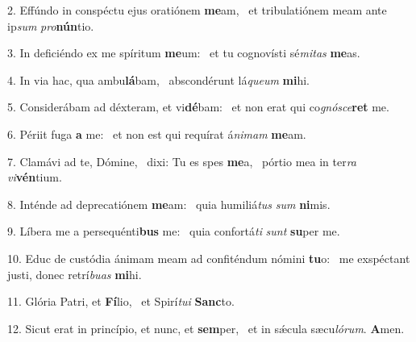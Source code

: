 2. Effúndo in conspéctu ejus oratiónem \textbf{me}am, \ast\  et tribulatiónem meam ante ip\textit{sum} \textit{pro}\textbf{nún}tio.\

3. In deficiéndo ex me spíritum \textbf{me}um: \ast\  et tu cognovísti sé\textit{mi}\textit{tas} \textbf{me}as.\

4. In via hac, qua ambu\textbf{lá}bam, \ast\  abscondérunt lá\textit{que}\textit{um} \textbf{mi}hi.\

5. Considerábam ad déxteram, et vi\textbf{dé}bam: \ast\  et non erat qui co\textit{gnó}\textit{sce}\textbf{ret} me.\

6. Périit fuga \textbf{a} me: \ast\  et non est qui requírat á\textit{ni}\textit{mam} \textbf{me}am.\

7. Clamávi ad te, Dómine, \dag\  dixi: Tu es spes \textbf{me}a, \ast\  pórtio mea in ter\textit{ra} \textit{vi}\textbf{vén}tium.\

8. Inténde ad deprecatiónem \textbf{me}am: \ast\  quia humiliá\textit{tus} \textit{sum} \textbf{ni}mis.\

9. Líbera me a persequénti\textbf{bus} me: \ast\  quia confortá\textit{ti} \textit{sunt} \textbf{su}per me.\

10. Educ de custódia ánimam meam ad confiténdum nómini \textbf{tu}o: \ast\  me exspéctant justi, donec retrí\textit{bu}\textit{as} \textbf{mi}hi.\

11. Glória Patri, et \textbf{Fí}lio, \ast\  et Spirí\textit{tu}\textit{i} \textbf{Sanc}to.\

12. Sicut erat in princípio, et nunc, et \textbf{sem}per, \ast\  et in sǽcula sæcu\textit{ló}\textit{rum}. \textbf{A}men.\

